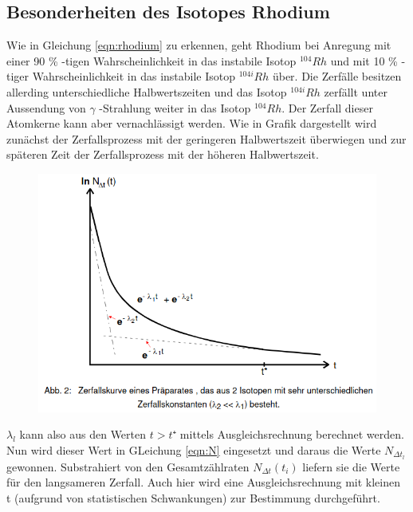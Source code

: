 \subsection{Besonderheiten des Isotopes Rhodium}
    Wie in Gleichung \ref{eqn:rhodium} zu erkennen, geht Rhodium bei Anregung mit einer 90 \% -tigen
    Wahrscheinlichkeit in das instabile Isotop $^{104}Rh$ und mit 10 \% -tiger Wahrscheinlichkeit 
    in das instabile Isotop $^{104i}Rh$ über. Die Zerfälle besitzen allerding unterschiedliche 
    Halbwertszeiten und das Isotop $^{104i}Rh$ zerfällt unter Aussendung von $\gamma$ -Strahlung 
    weiter in das Isotop $^{104}Rh$. Der Zerfall dieser Atomkerne kann aber vernachlässigt werden.
    Wie in Grafik dargestellt wird zunächst der Zerfallsprozess mit der geringeren Halbwertszeit
    überwiegen und zur späteren Zeit der Zerfallsprozess mit der höheren Halbwertszeit. 
    \begin{figure}[H]
        \centering
        \includegraphics{Kurve.png}
        \label{fig:plot}
    \end{figure}
    $\lambda_l$ kann also aus den Werten $t > t⁺$ mittels Ausgleichsrechnung berechnet werden. 
    Nun wird dieser Wert in GLeichung \ref{eqn:N} eingesetzt und daraus die Werte $N_{\Delta t_l}$
    gewonnen. Substrahiert von den Gesamtzählraten $N_{\Delta t}(t_i)$ liefern sie die Werte für den 
    langsameren Zerfall. Auch hier wird eine Ausgleichsrechnung mit kleinen t (aufgrund von 
    statistischen Schwankungen) zur Bestimmung durchgeführt. 
    
    